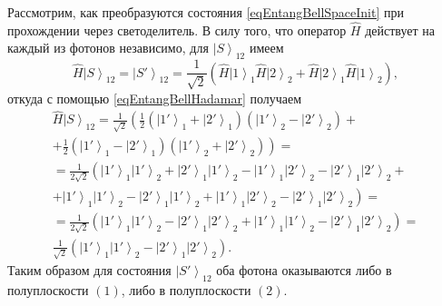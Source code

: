 


Рассмотрим, как преобразуются состояния \eqref{eqEntangBellSpaceInit}
при прохождении через светоделитель. В силу того, что оператор
$\hat{H}$ действует на каждый из фотонов независимо, для
$\left|S\right>_{12}$ имеем 
\begin{equation}
\hat{H}\left|S\right>_{12} = \left|S'\right>_{12} = 
\frac{1}{\sqrt{2}}
\left(
\hat{H}\left|1\right>_1\hat{H}\left|2\right>_2 +
\hat{H}\left|2\right>_1\hat{H}\left|1\right>_2
\right),
\nonumber 
\end{equation}
откуда с помощью \eqref{eqEntangBellHadamar} получаем
\begin{eqnarray}
\hat{H}\left|S\right>_{12} =
\frac{1}{\sqrt{2}}
\left(
\frac{1}{2}
\left(\left|1'\right>_1 +
\left|2'\right>_1\right)
\left(\left|1'\right>_2 -
\left|2'\right>_2\right) +
\right.
\nonumber \\
+ \left.
\frac{1}{2}
\left(\left|1'\right>_1 -
\left|2'\right>_1\right)
\left(\left|1'\right>_2 +
\left|2'\right>_2\right)
\right) = 
\nonumber \\
=
\frac{1}{2 \sqrt{2}}
\left(
\left|1'\right>_1 \left|1'\right>_2 +
\left|2'\right>_1 \left|1'\right>_2 -
\left|1'\right>_1 \left|2'\right>_2 -
\left|2'\right>_1 \left|2'\right>_2 +
\right. 
\nonumber \\
+ \left.
\left|1'\right>_1 \left|1'\right>_2 -
\left|2'\right>_1 \left|1'\right>_2 +
\left|1'\right>_1 \left|2'\right>_2 -
\left|2'\right>_1 \left|2'\right>_2
\right) =
\nonumber \\
=
\frac{1}{2 \sqrt{2}}
\left(
\left|1'\right>_1 \left|1'\right>_2 
- \left|2'\right>_1 \left|2'\right>_2 
+ \left|1'\right>_1 \left|1'\right>_2 
- \left|2'\right>_1 \left|2'\right>_2
\right) = 
\nonumber \\
\frac{1}{\sqrt{2}}
\left(
\left|1'\right>_1 \left|1'\right>_2 
- \left|2'\right>_1 \left|2'\right>_2 
\right).
\nonumber
\end{eqnarray}
Таким образом для состояния $\left|S'\right>_{12}$ оба фотона оказываются
либо в полуплоскости $\left(1\right)$, либо в полуплоскости
$\left(2\right)$. 

